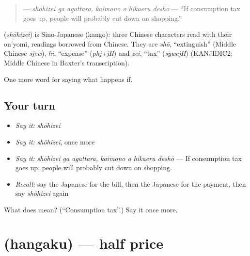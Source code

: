 \begin{quote}
\textbf{  } — \emph{shōhizei ga agattara, kaimono o hikaeru deshō} — \textquotedblleft{}If consumption tax goes up, people will probably cut down on shopping.\textquotedblright{}
\end{quote}

\begin{cousinweb}
\textbf{} (\emph{shōhizei}) is Sino-Japanese (kango): three Chinese characters read with their on'yomi, readings borrowed from Chinese. They are \emph{shō}, \textquotedblleft{}extinguish\textquotedblright{} (Middle Chinese \emph{sjew}), \emph{hi}, \textquotedblleft{}expense\textquotedblright{} (\emph{phj+jH}) and \emph{zei}, \textquotedblleft{}tax\textquotedblright{} (\emph{sywejH}) (KANJIDIC2; Middle Chinese in Baxter's transcription).
\end{cousinweb}

\begin{grammarlens}[title={What you've built}]
One more word for saying what happens if.
\end{grammarlens}

\subsection*{Your turn}
\begin{itemize}
\raggedright
  \item \emph{Say it:} \emph{shōhizei}
  \item \emph{Say it:} \emph{shōhizei}, once more
  \item \emph{Say it:} \emph{shōhizei ga agattara, kaimono o hikaeru deshō} — If consumption tax goes up, people will probably cut down on shopping.
  \item \emph{Recall:} say the Japanese for the bill, then the Japanese for the payment, then say \emph{shōhizei} again
\end{itemize}

\begin{tcolorbox}[breakable,colback=teal!4,colframe=teal!35!black,title={Before you move on}]
What does  mean? (\textquotedblleft{}Consumption tax\textquotedblright{}.) Say it once more.
\end{tcolorbox}
\section[\texorpdfstring{\ja{はんがく} (hangaku)}{はんがく (hangaku)}]{ (hangaku) — half price}

